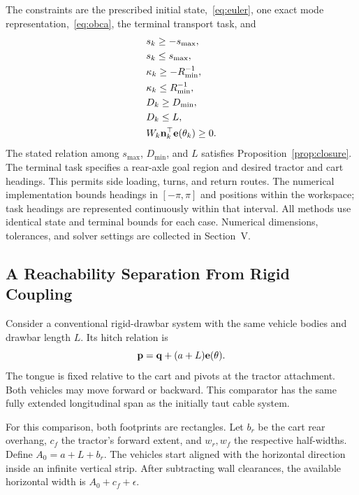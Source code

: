 The constraints are the prescribed initial state,~\eqref{eq:euler}, one exact mode representation,~\eqref{eq:obca}, the terminal transport task, and
\begin{equation}\begin{aligned}
 &s_k\geq-s_{\max},\\
 &s_k\leq s_{\max},\\
 &\kappa_k\geq-R_{\min}^{-1},\\
 &\kappa_k\leq R_{\min}^{-1},\\
 &D_k\geq D_{\min},\\
 &D_k\leq L,\\
 &W_k\mathbf n_k^\top\mathbf e(\theta_k)\geq0.
\end{aligned}\label{eq:bounds}\end{equation}
The stated relation among $s_{\max}$, $D_{\min}$, and $L$ satisfies Proposition~\ref{prop:closure}. The terminal task specifies a rear-axle goal region and desired tractor and cart headings. This permits side loading, turns, and return routes. The numerical implementation bounds headings in $[-\pi,\pi]$ and positions within the workspace; task headings are represented continuously within that interval. All methods use identical state and terminal bounds for each case. Numerical dimensions, tolerances, and solver settings are collected in Section~V.

\subsection{A Reachability Separation From Rigid Coupling}
Consider a conventional rigid-drawbar system with the same vehicle bodies and drawbar length $L$. Its hitch relation is
\begin{equation}
\mathbf p=\mathbf q+(a+L)\mathbf e(\theta).
\label{eq:rigid}
\end{equation}
The tongue is fixed relative to the cart and pivots at the tractor attachment. Both vehicles may move forward or backward. This comparator has the same fully extended longitudinal span as the initially taut cable system.

For this comparison, both footprints are rectangles. Let $b_r$ be the cart rear overhang, $c_f$ the tractor's forward extent, and $w_r,w_f$ the respective half-widths. Define $A_0=a+L+b_r$. The vehicles start aligned with the horizontal direction inside an infinite vertical strip. After subtracting wall clearances, the available horizontal width is $A_0+c_f+\epsilon$.

